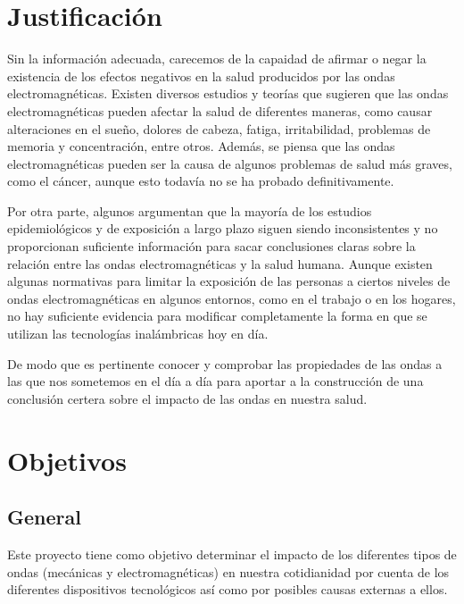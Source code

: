 \documentclass[spanish,notitlepage,letterpaper, 12pt]{article}
\begin{document}
\section{Justificación}
Sin la información adecuada, carecemos de la capaidad de afirmar o negar la existencia de los efectos negativos en la salud producidos por las ondas electromagnéticas. Existen diversos estudios y teorías que sugieren que las ondas electromagnéticas pueden afectar la salud de diferentes maneras, como
causar alteraciones en el sueño, dolores de cabeza, fatiga, irritabilidad, problemas de memoria y concentración, entre otros. Además, se piensa que las ondas electromagnéticas pueden ser la causa de algunos problemas de salud más graves, como el cáncer, aunque esto todavía no se ha probado
definitivamente.\par
\bigskip
Por otra parte, algunos argumentan que la mayoría de los estudios epidemiológicos y de exposición a largo plazo siguen siendo inconsistentes y no proporcionan suficiente información para sacar conclusiones claras sobre la relación entre las ondas electromagnéticas y la salud humana. Aunque existen
algunas normativas para limitar la exposición de las personas a ciertos niveles de ondas electromagnéticas en algunos entornos, como en el trabajo o en los hogares,  no hay suficiente evidencia para modificar completamente la forma en que se utilizan las tecnologías inalámbricas hoy en día.\par
\bigskip
De modo que es pertinente conocer y comprobar las propiedades de las ondas a las que nos sometemos en el día a día para aportar a la construcción de una conclusión certera sobre el impacto de las ondas en nuestra salud.
\section{Objetivos}
\subsection{General}
Este proyecto tiene como objetivo determinar el impacto de los diferentes tipos de ondas (mecánicas y electromagnéticas) en nuestra cotidianidad por cuenta de los diferentes dispositivos tecnológicos así como por posibles causas externas a ellos.
\end{document}
